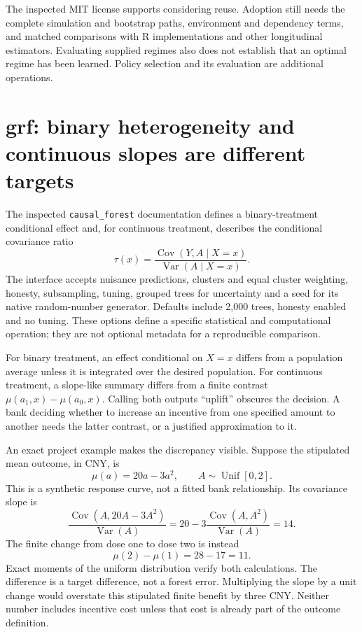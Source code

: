 The inspected MIT license supports considering reuse. Adoption still needs the
complete simulation and bootstrap paths, environment and dependency terms, and
matched comparisons with R implementations and other longitudinal estimators.
Evaluating supplied regimes also does not establish that an optimal regime has
been learned. Policy selection and its evaluation are additional operations.

\section{grf: binary heterogeneity and continuous slopes are different targets}

The inspected \texttt{causal\_forest} documentation defines a binary-treatment
conditional effect and, for continuous treatment, describes the conditional
covariance ratio
\[
 \tau(x)=\frac{\operatorname{Cov}(Y,A\mid X=x)}
                    {\operatorname{Var}(A\mid X=x)}.
\]
The interface accepts nuisance predictions, clusters and equal cluster
weighting, honesty, subsampling, tuning, grouped trees for uncertainty and a
seed for its native random-number generator. Defaults include 2,000 trees,
honesty enabled and no tuning. These options define a specific statistical and
computational operation; they are not optional metadata for a reproducible
comparison.\cite{v13_sw_grf}

For binary treatment, an effect conditional on $X=x$ differs from a population
average unless it is integrated over the desired population. For continuous
treatment, a slope-like summary differs from a finite contrast
$\mu(a_1,x)-\mu(a_0,x)$. Calling both outputs ``uplift'' obscures the decision.
A bank deciding whether to increase an incentive from one specified amount to
another needs the latter contrast, or a justified approximation to it.

An exact project example makes the discrepancy visible. Suppose the stipulated
mean outcome, in CNY, is
\[
 \mu(a)=20a-3a^2,\qquad A\sim\operatorname{Unif}[0,2].
\]
This is a synthetic response curve, not a fitted bank relationship. Its
covariance slope is
\[
 \frac{\operatorname{Cov}(A,20A-3A^2)}{\operatorname{Var}(A)}
 =20-3\frac{\operatorname{Cov}(A,A^2)}{\operatorname{Var}(A)}=14.
\]
The finite change from dose one to dose two is instead
\[
 \mu(2)-\mu(1)=28-17=11.
\]
Exact moments of the uniform distribution verify both calculations. The
difference is a target difference, not a forest error. Multiplying the slope
by a unit change would overstate this stipulated finite benefit by three CNY.
Neither number includes incentive cost unless that cost is already part of the
outcome definition.\cite{v13_project_exact}


